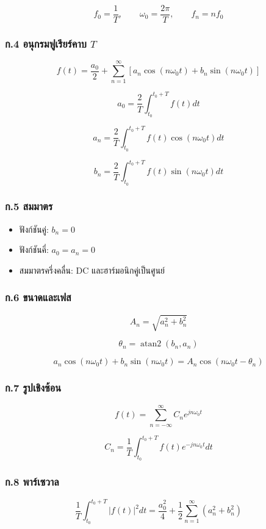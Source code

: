 \[
f_0=\frac{1}{T},\qquad \omega_0=\frac{2\pi}{T},\qquad f_n=nf_0
\]

\subsubsection[ก.4 อนุกรมฟูเรียร์คาบ T]{ก.4 อนุกรมฟูเรียร์คาบ \(T\)}

\[
f(t)=\frac{a_0}{2}+\sum_{n=1}^{\infty}[a_n\cos(n\omega_0t)+b_n\sin(n\omega_0t)]
\]

\[
a_0=\frac{2}{T}\int_{t_0}^{t_0+T}f(t)dt
\]

\[
a_n=\frac{2}{T}\int_{t_0}^{t_0+T}f(t)\cos(n\omega_0t)dt
\]

\[
b_n=\frac{2}{T}\int_{t_0}^{t_0+T}f(t)\sin(n\omega_0t)dt
\]

\subsubsection{ก.5 สมมาตร}

\begin{itemize}
\item
  ฟังก์ชันคู่: \(b_n=0\)
\item
  ฟังก์ชันคี่: \(a_0=a_n=0\)
\item
  สมมาตรครึ่งคลื่น: DC และฮาร์มอนิกคู่เป็นศูนย์
\end{itemize}

\subsubsection{ก.6 ขนาดและเฟส}

\[
A_n=\sqrt{a_n^2+b_n^2}
\]

\[
\theta_n=\operatorname{atan2}(b_n,a_n)
\]

\[
a_n\cos(n\omega_0t)+b_n\sin(n\omega_0t)
=A_n\cos(n\omega_0t-\theta_n)
\]

\subsubsection{ก.7 รูปเชิงซ้อน}

\[
f(t)=\sum_{n=-\infty}^{\infty}C_ne^{jn\omega_0t}
\]

\[
C_n=\frac{1}{T}\int_{t_0}^{t_0+T}f(t)e^{-jn\omega_0t}dt
\]

\subsubsection{ก.8 พาร์เซวาล}

\[
\frac{1}{T}\int_{t_0}^{t_0+T}|f(t)|^2dt
=\frac{a_0^2}{4}+\frac{1}{2}\sum_{n=1}^{\infty}(a_n^2+b_n^2)
\]

